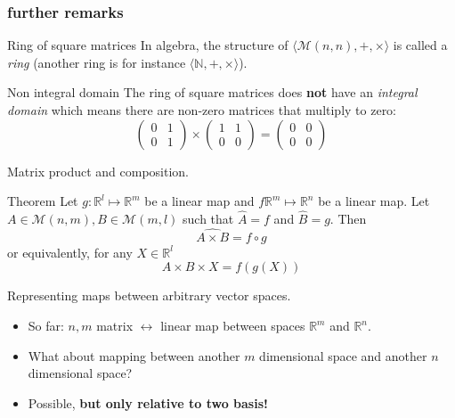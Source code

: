\documentclass{beamer}
\begin{document}
\begin{frame}
  \frametitle{further remarks}
  \begin{block}{Ring of square matrices}
    In algebra, the structure of $\langle \mathcal{M}(n,n), {+}, {\times} \rangle$ is called a \emph{ring} (another ring is for instance $\langle \mathbb{N}, {+}, {\times} \rangle$).
  \end{block}
  
  \begin{block}{Non integral domain}
    The ring of square matrices does \textbf{not} have an \emph{integral domain} which means there are non-zero matrices that multiply to zero:
    \[
    \begin{pmatrix}
      0 & 1\\
      0 & 1
    \end{pmatrix}
    \times
    \begin{pmatrix}
      1 & 1\\
      0 & 0
    \end{pmatrix}
    =
    \begin{pmatrix}
      0 & 0\\
      0 & 0
    \end{pmatrix}
    \]
  \end{block}
\end{frame}


\begin{frame}{Matrix product and composition.}
  \begin{block}{Theorem}
    Let $g: \mathbb{R}^l \mapsto \mathbb{R}^m$ be a linear map and $f \mathbb{R}^m \mapsto \mathbb{R}^n$ be a linear map. Let $A \in \mathcal{M}(n,m), B \in \mathcal{M}(m, l)$ such that $\hat A = f$ and $\hat B = g$. Then
    \[ \widehat{A \times B} = f \circ g \] or equivalently, for any $X \in \mathbb{R}^l$
    \[A \times B \times X = f(g(X))\]
  \end{block}
\end{frame}


\begin{frame}{Representing maps between arbitrary vector spaces.}
  \begin{itemize}
  \item So far: $n,m$ matrix $\leftrightarrow$ linear map between spaces $\mathbb{R}^m$ and $\mathbb{R}^n$.
  \item What about mapping between another $m$ dimensional space and another $n$ dimensional space?
  \item Possible, {\bf but only relative to two basis!}
  \end{itemize}
\end{frame}
\end{document}
